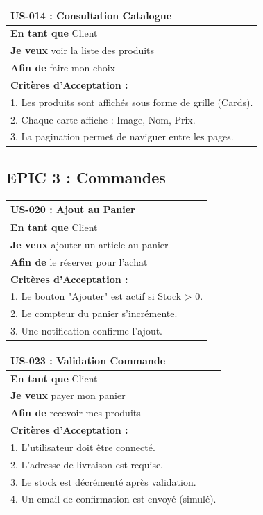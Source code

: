 \documentclass[12pt,a4paper]{article}
\begin{document}
\begin{longtable}{|p{15cm}|}
    \hline
    \textbf{US-014 : Consultation Catalogue} \\ \hline
    \textbf{En tant que} Client \\
    \textbf{Je veux} voir la liste des produits \\
    \textbf{Afin de} faire mon choix \\ \hline
    \textbf{Critères d'Acceptation :} \\
    1. Les produits sont affichés sous forme de grille (Cards). \\
    2. Chaque carte affiche : Image, Nom, Prix. \\
    3. La pagination permet de naviguer entre les pages. \\ \hline
\end{longtable}

\subsection{EPIC 3 : Commandes}

\begin{longtable}{|p{15cm}|}
    \hline
    \textbf{US-020 : Ajout au Panier} \\ \hline
    \textbf{En tant que} Client \\
    \textbf{Je veux} ajouter un article au panier \\
    \textbf{Afin de} le réserver pour l'achat \\ \hline
    \textbf{Critères d'Acceptation :} \\
    1. Le bouton "Ajouter" est actif si Stock > 0. \\
    2. Le compteur du panier s'incrémente. \\
    3. Une notification confirme l'ajout. \\ \hline
\end{longtable}

\begin{longtable}{|p{15cm}|}
    \hline
    \textbf{US-023 : Validation Commande} \\ \hline
    \textbf{En tant que} Client \\
    \textbf{Je veux} payer mon panier \\
    \textbf{Afin de} recevoir mes produits \\ \hline
    \textbf{Critères d'Acceptation :} \\
    1. L'utilisateur doit être connecté. \\
    2. L'adresse de livraison est requise. \\
    3. Le stock est décrémenté après validation. \\
    4. Un email de confirmation est envoyé (simulé). \\ \hline
\end{longtable}
\end{document}
